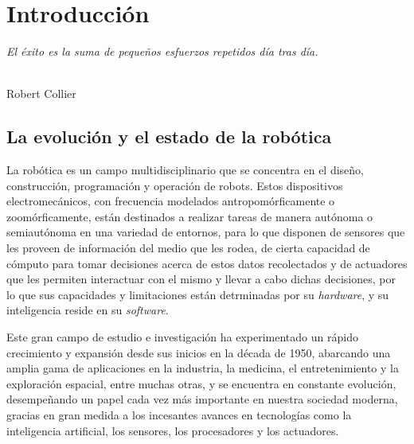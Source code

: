 \chapter{Introducción}
\label{cap:capitulo1}
\setcounter{page}{1}

\begin{flushright}
\begin{minipage}[]{10cm}
\emph{El éxito es la suma de pequeños esfuerzos repetidos día tras día.}\\
\end{minipage}\\

Robert Collier\\
\end{flushright}

\vspace{1cm}



\section{La evolución y el estado de la robótica}
\label{sec:robotica} %

La robótica es un campo multidisciplinario que se concentra en el diseño,
construcción, programación y operación de robots.
Estos dispositivos electromecánicos, con frecuencia modelados
antropomórficamente o zoomórficamente, están destinados a realizar tareas de
manera autónoma o semiautónoma en una variedad de entornos, para lo que disponen
de sensores que les proveen de información del medio que les rodea, de cierta
capacidad de cómputo para tomar decisiones acerca de estos datos recolectados y
de actuadores que les permiten interactuar con el mismo y llevar a cabo dichas
decisiones, por lo que sus capacidades y limitaciones están detrminadas por su
\textit{hardware}, y su inteligencia reside en su \textit{software}.

Este gran campo de estudio e investigación ha experimentado un rápido
crecimiento y expansión desde sus inicios en la década de 1950, abarcando una
amplia gama de aplicaciones en la industria, la medicina, el entretenimiento y
la exploración espacial, entre muchas otras, y se encuentra en constante
evolución, desempeñando un papel cada vez más importante en nuestra sociedad
moderna, gracias en gran medida a los incesantes avances en tecnologías como la
inteligencia artificial, los sensores, los procesadores y los actuadores.



